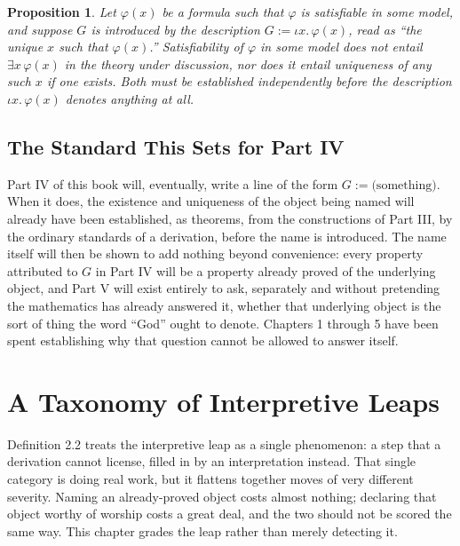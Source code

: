 \documentclass[11pt]{book}
\newtheorem{proposition}[theorem]{Proposition}
\begin{document}
\begin{proposition}
Let $\varphi(x)$ be a formula such that $\varphi$ is satisfiable in some model, and suppose $G$ is introduced by the description $G := \iota x.\, \varphi(x)$, read as ``the unique $x$ such that $\varphi(x)$.'' Satisfiability of $\varphi$ in some model does not entail $\exists x\, \varphi(x)$ in the theory under discussion, nor does it entail uniqueness of any such $x$ if one exists. Both must be established independently before the description $\iota x.\, \varphi(x)$ denotes anything at all.
\end{proposition}

\section{The Standard This Sets for Part IV}

Part IV of this book will, eventually, write a line of the form $G := \text{(something)}$. When it does, the existence and uniqueness of the object being named will already have been established, as theorems, from the constructions of Part III, by the ordinary standards of a derivation, before the name is introduced. The name itself will then be shown to add nothing beyond convenience: every property attributed to $G$ in Part IV will be a property already proved of the underlying object, and Part V will exist entirely to ask, separately and without pretending the mathematics has already answered it, whether that underlying object is the sort of thing the word ``God'' ought to denote. Chapters 1 through 5 have been spent establishing why that question cannot be allowed to answer itself.

\chapter*{A Taxonomy of Interpretive Leaps}

Definition 2.2 treats the interpretive leap as a single phenomenon: a step that a derivation cannot license, filled in by an interpretation instead. That single category is doing real work, but it flattens together moves of very different severity. Naming an already-proved object costs almost nothing; declaring that object worthy of worship costs a great deal, and the two should not be scored the same way. This chapter grades the leap rather than merely detecting it.
\end{document}
